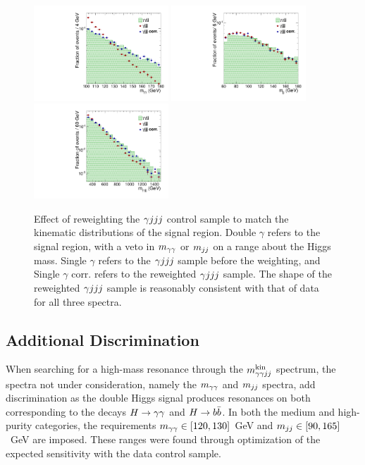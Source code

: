 \begin{figure}[htbp!]
 \begin{center}
   \includegraphics[width=0.45\textwidth]{figures/selection/mggSpectrum-log.pdf}
   \includegraphics[width=0.45\textwidth]{figures/selection/mjjSpectrum-log.pdf}
   \includegraphics[width=0.45\textwidth]{figures/selection/mradSpectrum-log.pdf}
 \end{center}
\caption{Effect of reweighting the $\gamma jjj$ control sample
to match the kinematic distributions of the
signal region. Double $\gamma$ refers to the signal region, with a veto in $m_{\gamma\gamma}$ or $m_{jj}$
on a range about the Higgs mass. Single $\gamma$
refers to the $\gamma jjj$ sample before the weighting, and Single $\gamma$ corr. refers to the reweighted
$\gamma jjj$ sample. The shape of the reweighted $\gamma jjj$ sample is reasonably consistent with that of data
for all three spectra.}
\label{fig:datacs}
\end{figure}

\subsection{Additional Discrimination\label{subsec:add_discrimination}}

When searching for a high-mass resonance through the $m_{\gamma\gamma jj}^{\rm kin}$ spectrum, the spectra not under
consideration, namely the $m_{\gamma\gamma}$ and $m_{jj}$ spectra, add discrimination as the double Higgs
signal produces resonances on both corresponding to the decays $H\to\gamma\gamma$ and $H\to b\bar{b}$. In both
the medium and high-purity categories,
the requirements $m_{\gamma\gamma} \in [120, 130]$~GeV and $m_{jj} \in [90, 165]$~GeV
are imposed.
These ranges were found through optimization of the expected sensitivity with the data control sample.


